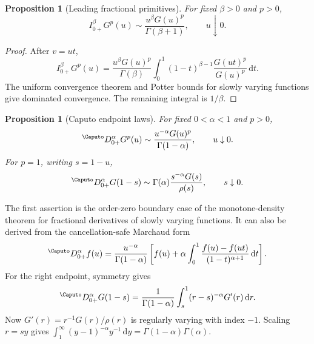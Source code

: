 \documentclass[11pt,oneside]{article}
\newtheorem{proposition}[theorem]{Proposition}
\theoremstyle{definition}
\theoremstyle{remark}
\newcommand{\dd}{\,\mathrm d}
\newcommand{\1}{\mathbf 1}
\begin{document}
\begin{proposition}[Leading fractional primitives]
\label{p11:prop:leading-RL-G}
For fixed $\beta>0$ and $p>0$,
\begin{equation}
 I_{0+}^{\beta}G^p(u)
 \sim\frac{u^\beta G(u)^p}{\Gamma(\beta+1)},
 \qquad u\downarrow0.
 \label{p11:eq:RL-G-leading}
\end{equation}
\end{proposition}

\begin{proof}
After $v=ut$,
\begin{equation}
 I_{0+}^{\beta}G^p(u)
 =\frac{u^\beta G(u)^p}{\Gamma(\beta)}
  \int_0^1(1-t)^{\beta-1}
  \frac{G(ut)^p}{G(u)^p}\dd t.
\end{equation}
The uniform convergence theorem and Potter bounds for slowly varying
functions give dominated convergence.  The remaining integral is $1/\beta$.
\end{proof}

\begin{proposition}[Caputo endpoint laws]
\label{p11:prop:caputo-endpoints}
For fixed $0<\alpha<1$ and $p>0$,
\begin{equation}
 {}^{\Caputo}D_{0+}^{\alpha}G^p(u)
 \sim\frac{u^{-\alpha}G(u)^p}{\Gamma(1-\alpha)},
 \qquad u\downarrow0.
 \label{p11:eq:caputo-left-leading}
\end{equation}
For $p=1$, writing $s=1-u$,
\begin{equation}
 {}^{\Caputo}D_{0+}^{\alpha}G(1-s)
 \sim\Gamma(\alpha)
 \frac{s^{-\alpha}G(s)}{\rho(s)},
 \qquad s\downarrow0.
 \label{p11:eq:caputo-right-leading}
\end{equation}
\end{proposition}

\begin{proofidea}
The first assertion is the order-zero boundary case of the monotone-density
theorem for fractional derivatives of slowly varying functions.  It can also
be derived from the cancellation-safe Marchaud form
\begin{equation}
 {}^{\Caputo}D_{0+}^{\alpha}f(u)
 =\frac{u^{-\alpha}}{\Gamma(1-\alpha)}\left[
 f(u)+\alpha\int_0^1
 \frac{f(u)-f(ut)}{(1-t)^{\alpha+1}}\dd t
 \right].
\end{equation}
For the right endpoint, symmetry gives
\begin{equation}
 {}^{\Caputo}D_{0+}^{\alpha}G(1-s)
 =\frac1{\Gamma(1-\alpha)}
  \int_s^1(r-s)^{-\alpha}G'(r)\dd r.
\end{equation}
Now $G'(r)=r^{-1}G(r)/\rho(r)$ is regularly varying with index $-1$.
Scaling $r=sy$ gives
$\int_1^\infty(y-1)^{-\alpha}y^{-1}\dd y
=\Gamma(1-\alpha)\Gamma(\alpha)$.
\end{proofidea}
\end{document}
